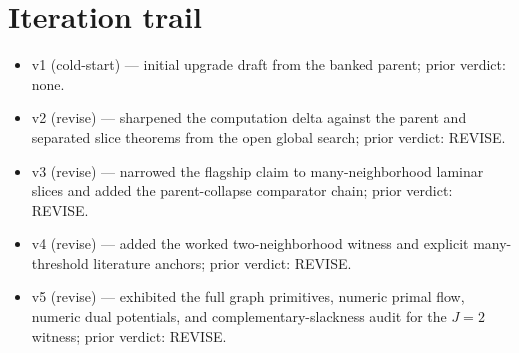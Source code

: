 \documentclass[11pt]{article}
\theoremstyle{definition}
\theoremstyle{plain}
\theoremstyle{remark}
\begin{document}
\section{Iteration trail}
\begin{itemize}[leftmargin=*]
\item v1 (cold-start) --- initial upgrade draft from the banked parent; prior verdict: none.
\item v2 (revise) --- sharpened the computation delta against the parent and separated slice theorems from the open global search; prior verdict: REVISE.
\item v3 (revise) --- narrowed the flagship claim to many-neighborhood laminar slices and added the parent-collapse comparator chain; prior verdict: REVISE.
\item v4 (revise) --- added the worked two-neighborhood witness and explicit many-threshold literature anchors; prior verdict: REVISE.
\item v5 (revise) --- exhibited the full graph primitives, numeric primal flow, numeric dual potentials, and complementary-slackness audit for the \(J=2\) witness; prior verdict: REVISE.
\end{itemize}
\end{document}
